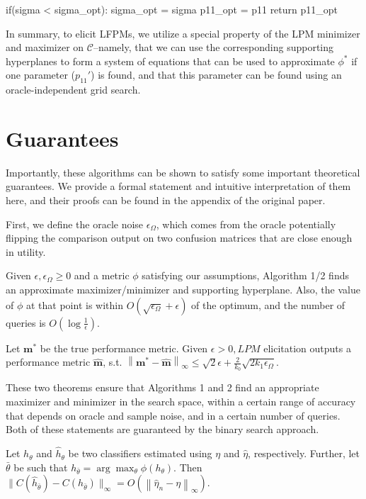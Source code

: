 \documentclass[
  letterpaper,
  DIV=11,
  numbers=noendperiod,
  oneside]{scrreprt}
\theoremstyle{remark}
\begin{document}
if(sigma \textless{} sigma\_opt): sigma\_opt = sigma p11\_opt = p11
return p11\_opt

In summary, to elicit LFPMs, we utilize a special property of the LPM
minimizer and maximizer on \(\mathcal{C}\)--namely, that we can use the
corresponding supporting hyperplanes to form a system of equations that
can be used to approximate \(\phi^*\) if one parameter (\(p_{11}'\)) is
found, and that this parameter can be found using an oracle-independent
grid search.

\section{Guarantees}\label{sec:orga500da2}

Importantly, these algorithms can be shown to satisfy some important
theoretical guarantees. We provide a formal statement and intuitive
interpretation of them here, and their proofs can be found in the
appendix of the original paper.

First, we define the oracle noise \(\epsilon_{\Omega}\), which comes
from the oracle potentially flipping the comparison output on two
confusion matrices that are close enough in utility.

Given \(\epsilon, \epsilon_{\Omega} \geq 0\) and a metric \(\phi\)
satisfying our assumptions, Algorithm 1/2 finds an approximate
maximizer/minimizer and supporting hyperplane. Also, the value of
\(\phi\) at that point is within
\(O\left(\sqrt{\epsilon_{\Omega}}+\epsilon\right)\) of the optimum, and
the number of queries is \(O\left(\log \frac{1}{\epsilon}\right)\).

Let \(\mathbf{m}^{*}\) be the true performance metric. Given
\(\epsilon>0, L P M\) elicitation outputs a performance metric
\(\hat{\mathbf{m}}\), s.t.
\(\left\|\mathbf{m}^{*}-\hat{\mathbf{m}}\right\|_{\infty} \leq \sqrt{2} \epsilon+\frac{2}{k_{0}} \sqrt{2 k_{1} \epsilon_{\Omega}}\).

These two theorems ensure that Algorithms 1 and 2 find an appropriate
maximizer and minimizer in the search space, within a certain range of
accuracy that depends on oracle and sample noise, and in a certain
number of queries. Both of these statements are guaranteed by the binary
search approach.

Let \(h_{\theta}\) and \(\hat{h}_{\theta}\) be two classifiers estimated
using \(\eta\) and \(\hat{\eta}\), respectively. Further, let
\(\bar{\theta}\) be such that
\(h_{\bar{\theta}}=\arg \max _{\theta} \phi\left(h_{\theta}\right)\).
Then
\(\|C(\hat{h}_{\bar{\theta}})-C\left(h_{\bar{\theta}}\right)\|_{\infty}=O\left(\left\|\hat{\eta}_{n}-\eta\right\|_{\infty}\right)\).
\end{document}
